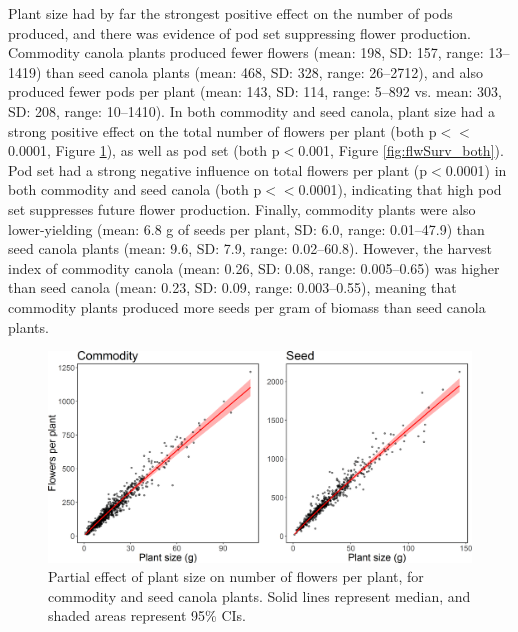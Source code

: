 \documentclass[12pt]{article} %
\begin{document}
Plant size had by far the strongest positive effect on the number of pods produced, and there was evidence of pod set suppressing flower production.
Commodity canola plants produced fewer flowers (mean: 198, SD: 157, range: 13--1419) than seed canola plants (mean: 468, SD: 328, range: 26--2712), and also produced fewer pods per plant (mean: 143, SD: 114, range: 5--892 vs. mean: 303, SD: 208, range: 10--1410).
In both commodity and seed canola, plant size had a strong positive effect on the total number of flowers per plant (both p$<<$0.0001, Figure \ref{fig:plSizeFlwCount}), as well as pod set (both p$<$0.001, Figure \ref{fig:flwSurv_both}).
Pod set had a strong negative influence on total flowers per plant (p$<$0.0001) in both commodity and seed canola (both p$<<$0.0001), indicating that high pod set suppresses future flower production.
Finally, commodity plants were also lower-yielding (mean: 6.8 g of seeds per plant, SD: 6.0, range: 0.01--47.9) than seed canola plants (mean: 9.6, SD: 7.9, range: 0.02--60.8).
However, the harvest index of commodity canola (mean: 0.26, SD: 0.08, range: 0.005--0.65) was higher than seed canola (mean: 0.23, SD: 0.09, range: 0.003--0.55), meaning that commodity plants produced more seeds per gram of biomass than seed canola plants.%


\begin{figure} %
    \centering
    \includegraphics[width=\textwidth,keepaspectratio=true]{plSizeflwCount_both.png}
    \caption[Partial effect of plant size on number of flowers per plant]{Partial effect of plant size on number of flowers per plant, for commodity and seed canola plants. Solid lines represent median, and shaded areas represent 95\% CIs.}
    \label{fig:plSizeFlwCount}
\end{figure}
\end{document}
